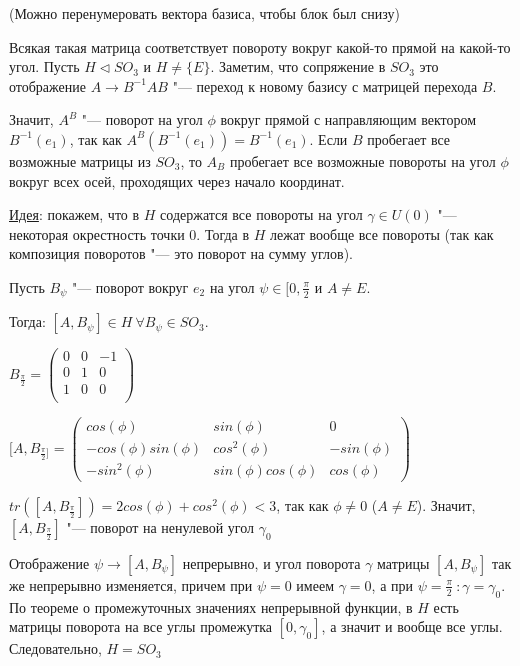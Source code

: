\documentclass{article}
\begin{document}
(Можно перенумеровать вектора базиса, чтобы блок был снизу)

Всякая такая матрица соответствует повороту вокруг какой-то прямой на какой-то угол. Пусть $H \triangleleft SO_3$ и $H \neq \{E\}$. Заметим, что сопряжение в $SO_3$ это отображение $A \rightarrow B^{-1}AB$ "--- переход к новому базису с матрицей перехода $B$.

Значит, $A^B$ "--- поворот на угол $\phi$ вокруг прямой с направляющим вектором $B^{-1}(e_1)$, так как $A^B(B^{-1}(e_1)) = B^{-1}(e_1)$. Если $B$ пробегает все возможные матрицы из $SO_3$, то $A_B$ пробегает все возможные повороты на угол $\phi$ вокруг всех осей, проходящих через начало координат.

\underline{Идея}: покажем, что в $H$ содержатся все повороты на угол $\gamma \in U(0)$ "--- некоторая окрестность точки 0. Тогда в $H$ лежат вообще все повороты (так как композиция поворотов "--- это поворот на сумму углов).

Пусть $B_{\psi}$ "--- поворот вокруг $e_2$ на угол $\psi \in [0, \frac{\pi}{2}$ и $A \neq E$. 

Тогда: $[A, B_{\psi}] \in H \  \forall B_{\psi} \in SO_3$.

$B_{\frac{\pi}{2}} = \begin{pmatrix}
0 & 0 & -1 \\
0 & 1 & 0 \\
1 & 0 & 0 \\
\end{pmatrix}$

$[A, B_{\frac{\pi}{2}]} = \begin{pmatrix}
cos(\phi) & sin(\phi) & 0 \\
-cos(\phi)sin(\phi) & cos^2(\phi) & -sin(\phi) \\
-sin^2(\phi) & sin(\phi)cos(\phi) & cos(\phi)
\end{pmatrix}$

$tr([A, B_{\frac{\pi}{2}}]) = 2cos(\phi) + cos^2(\phi) < 3$, так как $\phi \neq 0$ ($A \neq E$). Значит, $[A, B_{\frac{\pi}{2}}]$ "--- поворот на ненулевой угол $\gamma_0$

Отображение $\psi \rightarrow [A, B_{\psi}]$ непрерывно, и угол поворота $\gamma$ матрицы $[A, B_{\psi}]$ так же непрерывно изменяется, причем при $\psi = 0$ имеем $\gamma = 0$, а при $\psi = \frac{\pi}{2} \ :  \gamma = \gamma_0$. По теореме о промежуточных значениях непрерывной функции, в $H$ есть матрицы поворота на все углы промежутка $[0, \gamma_0]$, а значит и вообще все углы. Следовательно, $H = SO_3$
\end{document}
